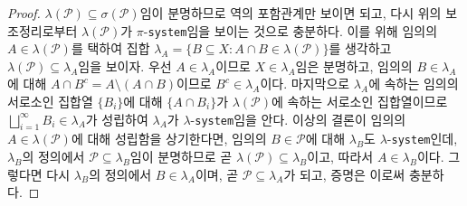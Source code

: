 \begin{proof}
    $\lambda(\mathcal{P})\subseteq\sigma(\mathcal{P})$임이 분명하므로 역의 포함관계만 보이면 되고, 다시 위의 보조정리로부터 $\lambda(\mathcal{P})$가 $\pi$-\texttt{system}임을 보이는 것으로 충분하다. 이를 위해 임의의 $A\in\lambda(\mathcal{P})$를 택하여 집합 $\lambda_A=\{B\subseteq X:A\cap B\in\lambda(\mathcal{P})\}$를 생각하고 $\lambda(\mathcal{P})\subseteq\lambda_A$임을 보이자. 우선 $A\in\lambda_A$이므로 $X\in\lambda_A$임은 분명하고, 임의의 $B\in\lambda_A$에 대해 $A\cap B^c=A\setminus(A\cap B)$이므로 $B^c\in\lambda_A$이다. 마지막으로 $\lambda_A$에 속하는 임의의 서로소인 집합열 $\{B_i\}$에 대해 $\{A\cap B_i\}$가 $\lambda(\mathcal{P})$에 속하는 서로소인 집합열이므로 $\bigsqcup_{i=1}^\infty B_i\in\lambda_A$가 성립하여 $\lambda_A$가 $\lambda$-\texttt{system}임을 안다. 이상의 결론이 임의의 $A\in\lambda(\mathcal{P})$에 대해 성립함을 상기한다면, 임의의 $B\in\mathcal{P}$에 대해 $\lambda_B$도 $\lambda$-\texttt{system}인데, $\lambda_B$의 정의에서 $\mathcal{P}\subseteq\lambda_B$임이 분명하므로 곧 $\lambda(\mathcal{P})\subseteq\lambda_B$이고, 따라서 $A\in\lambda_B$이다. 그렇다면 다시 $\lambda_B$의 정의에서 $B\in\lambda_A$이며, 곧 $\mathcal{P}\subseteq\lambda_A$가 되고, 증명은 이로써 충분하다.
\end{proof}





